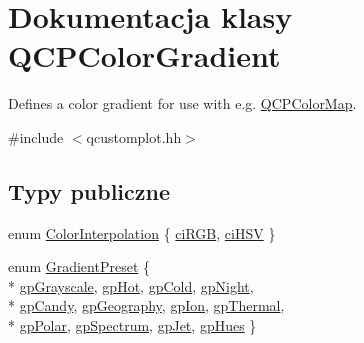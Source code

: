 \hypertarget{class_q_c_p_color_gradient}{}\section{Dokumentacja klasy Q\+C\+P\+Color\+Gradient}
\label{class_q_c_p_color_gradient}


Defines a color gradient for use with e.\+g. \hyperlink{class_q_c_p_color_map}{Q\+C\+P\+Color\+Map}.  




{\ttfamily \#include $<$qcustomplot.\+hh$>$}

\subsection*{Typy publiczne}
\begin{DoxyCompactItemize}
\item 
enum \hyperlink{class_q_c_p_color_gradient_ac5dca17cc24336e6ca176610e7f77fc1}{Color\+Interpolation} \{ \hyperlink{class_q_c_p_color_gradient_ac5dca17cc24336e6ca176610e7f77fc1a5e30f725c9cfe93999e268a9f92afbe7}{ci\+R\+GB}, 
\hyperlink{class_q_c_p_color_gradient_ac5dca17cc24336e6ca176610e7f77fc1af14ae62fcae11ecc07234eeaec5856cb}{ci\+H\+SV}
 \}
\item 
enum \hyperlink{class_q_c_p_color_gradient_aed6569828fee337023670272910c9072}{Gradient\+Preset} \{ \\*
\hyperlink{class_q_c_p_color_gradient_aed6569828fee337023670272910c9072add11ae369a86f3b1b6205ec72e5021fb}{gp\+Grayscale}, 
\hyperlink{class_q_c_p_color_gradient_aed6569828fee337023670272910c9072a4f42e534cf6cff5a29a5388094d099b5}{gp\+Hot}, 
\hyperlink{class_q_c_p_color_gradient_aed6569828fee337023670272910c9072aec8c001f62c0d5cb853db5fd85309557}{gp\+Cold}, 
\hyperlink{class_q_c_p_color_gradient_aed6569828fee337023670272910c9072a1bb89351b6def7d220973443fe059c62}{gp\+Night}, 
\\*
\hyperlink{class_q_c_p_color_gradient_aed6569828fee337023670272910c9072a9e72663bf6b94b65945f7843f24e0721}{gp\+Candy}, 
\hyperlink{class_q_c_p_color_gradient_aed6569828fee337023670272910c9072a382f0b07cec1a59d8a533438aea815d2}{gp\+Geography}, 
\hyperlink{class_q_c_p_color_gradient_aed6569828fee337023670272910c9072a4297f4f9e212a819cd65e8e34567182b}{gp\+Ion}, 
\hyperlink{class_q_c_p_color_gradient_aed6569828fee337023670272910c9072af1676b129f9f458ace453f280c731cf7}{gp\+Thermal}, 
\\*
\hyperlink{class_q_c_p_color_gradient_aed6569828fee337023670272910c9072ab7414ce4e36dc3e82e0132a7f0f41b52}{gp\+Polar}, 
\hyperlink{class_q_c_p_color_gradient_aed6569828fee337023670272910c9072ad63adc100ef46f6b4a8a6deacec4642f}{gp\+Spectrum}, 
\hyperlink{class_q_c_p_color_gradient_aed6569828fee337023670272910c9072a5f8a9e67b64c17ddfe4f069fe2b9fb02}{gp\+Jet}, 
\hyperlink{class_q_c_p_color_gradient_aed6569828fee337023670272910c9072a30efe58407acfb67939032f70213a130}{gp\+Hues}
 \}
\end{DoxyCompactItemize}
